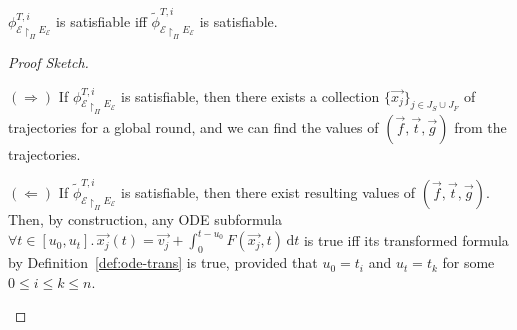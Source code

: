 \begin{theorem}
$\phi_{\mathcal{E} \restriction_{\Pi} E_\mathcal{E}}^{T,i}$
is satisfiable
iff
$\tilde{\phi}_{\mathcal{E} \restriction_{\Pi} E_\mathcal{E}}^{T,i}$
is satisfiable.
\end{theorem}

\begin{proof}[Proof Sketch]
\begin{inparaenum}
	\item[$(\Rightarrow)$]
	If $\phi_{\mathcal{E} \restriction_{\Pi} E_\mathcal{E}}^{T,i}$ is satisfiable,
	then there exists a collection $\{\vec{x_j}\}_{j \in J_S \cup J_F}$ of trajectories 
	for a global round, and we can find the values of $(\vec{f}, \vec{t}, \vec{g})$
	from the trajectories.
	\item[$(\Leftarrow)$]
	If $\tilde{\phi}_{\mathcal{E} \restriction_{\Pi} E_\mathcal{E}}^{T,i}$ is satisfiable,
	then there exist resulting values of $(\vec{f}, \vec{t}, \vec{g})$.
	Then,
	by construction, 
	any ODE subformula
	$\forall t \in [u_0,u_t].\, \vec{x_j}(t) = \vec{v_j} + \int_0^{t-u_0} \!  F(\vec{x_j},t)\,\mathrm{d}t$ is true
	iff its transformed formula by Definition~\ref{def:ode-trans} is true,
	provided that $u_0 = t_i$ and $u_t = t_k$ for some $0 \leq i \leq k \leq n$.
\end{inparaenum}
\end{proof}








